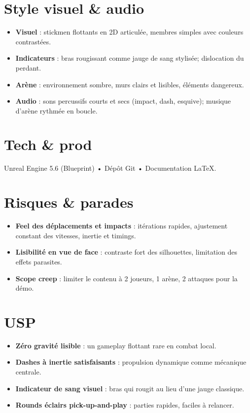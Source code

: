 \documentclass[10.8pt,letterpaper]{article}
\begin{document}
\begin{multicols}{2}
\section*{Style visuel \& audio}
\begin{itemize}
  \item \textbf{Visuel} : stickmen flottants en 2D articulée, membres simples avec couleurs contrastées.
  \item \textbf{Indicateurs} : bras rougissant comme jauge de sang stylisée; dislocation du perdant.
  \item \textbf{Arène} : environnement sombre, murs clairs et lisibles, éléments dangereux.
  \item \textbf{Audio} : sons percussifs courts et secs (impact, dash, esquive); musique d’arène rythmée en boucle.
\end{itemize}

\section*{Tech \& prod}
Unreal Engine 5.6 (Blueprint) • Dépôt Git • Documentation \LaTeX{}.

\section*{Risques \& parades}
\begin{itemize}
  \item \textbf{Feel des déplacements et impacts} : itérations rapides, ajustement constant des vitesses, inertie et timings.
  \item \textbf{Lisibilité en vue de face} : contraste fort des silhouettes, limitation des effets parasites.
  \item \textbf{Scope creep} : limiter le contenu à 2 joueurs, 1 arène, 2 attaques pour la démo.
\end{itemize}

\section*{USP}
\begin{itemize}
  \item \textbf{Zéro gravité lisible} : un gameplay flottant rare en combat local.
  \item \textbf{Dashes à inertie satisfaisants} : propulsion dynamique comme mécanique centrale.
  \item \textbf{Indicateur de sang visuel} : bras qui rougit au lieu d'une jauge classique.
  \item \textbf{Rounds éclairs pick-up-and-play} : parties rapides, faciles à relancer.
\end{itemize}

\end{multicols}
\end{document}
